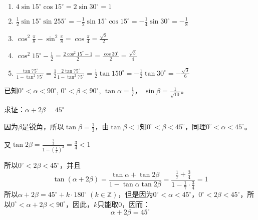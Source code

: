 \begin{solution}
\begin{enumerate}
    \item $4\sin 15^{\circ}\cos 15^{\circ}=2\sin 30^{\circ}=1$
    \item $\frac{1}{2}\sin 15^{\circ}\sin 255^{\circ}=-\frac{1}{2}\sin 15^{\circ}\cos 15^{\circ}=-\frac{1}{4}\sin 30^{\circ}=-\frac{1}{8}$
    \item $\cos^2\frac{\pi}{8}-\sin^2\frac{\pi}{8}=\cos\frac{\pi}{4}=\frac{\sqrt{2}}{2}$
    \item $\cos^2 15^{\circ}-\frac{1}{2}=\frac{2\cos^2 15^{\circ}-1}{2}=\frac{\cos 30^{\circ}}{2}=\frac{\sqrt{3}}{4}$
    \item $\frac{\tan 75^{\circ}}{1-\tan^2 75^{\circ}}=\frac{1}{2}\frac{2\tan 75^{\circ}}{1-\tan^2 75^{\circ}}=\frac{1}{2}\tan 150^{\circ}=-\frac{1}{2}\tan 30^{\circ}=-\frac{\sqrt{3}}{6}$
\end{enumerate}    
\end{solution}

\begin{example}
    已知$0^{\circ}<\alpha<90^{\circ}$, $0^{\circ}<\beta<90^{\circ}$, $\tan\alpha=\frac{1}{7}$，
    $\sin\beta=\frac{1}{\sqrt{10}}$。
    
    求证：$\alpha+2\beta=45^{\circ}$
\end{example}

\begin{figure}[htp]
    \centering
    \caption{}
\end{figure}


\begin{solution}
因为$\beta$是锐角，所以$\tan\beta=\frac{1}{3}$，由$\tan\beta<1$知$0^{\circ}<\beta<45^{\circ}$，同理$0^{\circ}<\alpha<45^{\circ}$。

又$\tan2\beta=\frac{\frac{2}{3}}{1-\left(\frac{1}{3}\right)^2}=\frac{3}{4}<1$

所以$0^{\circ}<2\beta <45^{\circ}$，并且
\[\tan(\alpha+2\beta)=\frac{\tan \alpha+\tan2\beta}{1-\tan \alpha\tan2\beta}=\frac{\frac{1}{7}+\frac{3}{4}}{1-\frac{1}{7}\cdot \frac{3}{4}}=1\]
所以$\alpha+2\beta=45^{\circ}+k\cdot 180^{\circ}\; (k\in\mathbb{Z})$，但是因为$0^{\circ}<\alpha<45^{\circ}$，$0^{\circ}<2\beta <45^{\circ}$，所以$0^{\circ}<\alpha+2\beta<90^{\circ}$，因此，$k$只能取0，因而：
\[\alpha+2\beta=45^{\circ}\]
\end{solution}


